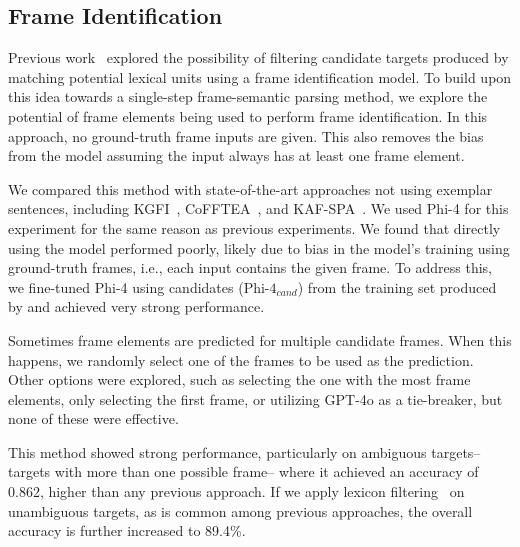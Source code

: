 
\subsection{Frame Identification}
Previous work~\cite{devasier-etal-2024-robust} explored the possibility of filtering candidate targets produced by matching potential lexical units using a frame identification model. To build upon this idea towards a single-step frame-semantic parsing method, we explore the potential of frame elements being used to perform frame identification. In this approach, no ground-truth frame inputs are given. This also removes the bias from the model assuming the input always has at least one frame element. 

We compared this method with state-of-the-art approaches not using exemplar sentences, including KGFI~\cite{su-etal-2021-knowledge}, CoFFTEA~\cite{an-etal-2023-coarse}, and KAF-SPA~\cite{zhang2023knowledge}. We used Phi-4 for this experiment for the same reason as previous experiments. We found that directly using the model performed poorly, likely due to bias in the model's training using ground-truth frames, i.e., each input contains the given frame. To address this, we fine-tuned Phi-4 using candidates ($\text{Phi-4}_{cand}$) from the training set produced by \citet{devasier-etal-2024-robust} and achieved very strong performance. 

Sometimes frame elements are predicted for multiple candidate frames. When this happens, we randomly select one of the frames to be used as the prediction. Other options were explored, such as selecting the one with the most frame elements, only selecting the first frame, or utilizing GPT-4o as a tie-breaker, but none of these were effective. 

This method showed strong performance, particularly on ambiguous targets--targets with more than one possible frame-- where it achieved an accuracy of 0.862, higher than any previous approach. If we apply lexicon filtering~\cite{su-etal-2021-knowledge} on unambiguous targets, as is common among previous approaches, the overall accuracy is further increased to 89.4\%.

